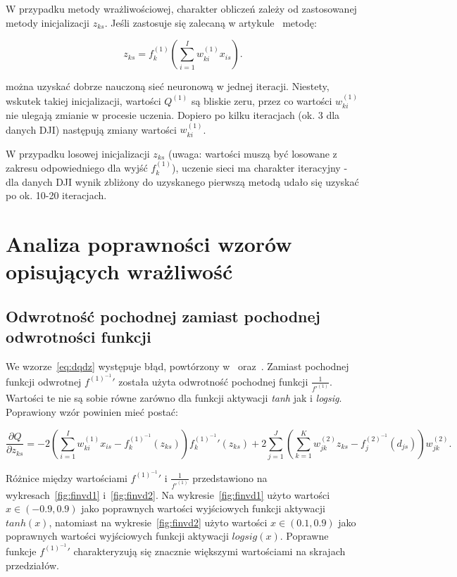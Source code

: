 \documentclass[11pt,a4paper]{article}
\begin{document}
W przypadku metody wrażliwościowej, charakter obliczeń zależy od zastosowanej metody inicjalizacji $z_{ks}$. Jeśli zastosuje się zalecaną w artykule~\cite{castillo2006very} metodę:

\begin{equation}
z_{ks} = f^{(1)}_{k} \left( \sum_{i=1}^{I} w^{(1)}_{ki} x_{is} \right).
\label{eq:zinit}
\end{equation}

\noindent można uzyskać dobrze nauczoną sieć neuronową w jednej iteracji. Niestety, wskutek takiej inicjalizacji, wartości $Q^{(1)}$ są bliskie zeru, przez co wartości $w_{ki}^{(1)}$ nie ulegają zmianie w procesie uczenia. Dopiero po kilku iteracjach (ok. 3 dla danych DJI) następują zmiany wartości $w_{ki}^{(1)}$.

W przypadku losowej inicjalizacji $z_{ks}$ (uwaga: wartości muszą być losowane z zakresu odpowiedniego dla wyjść $f_k^{(1)}$), uczenie sieci ma charakter iteracyjny - dla danych DJI wynik zbliżony do uzyskanego pierwszą metodą udało się uzyskać po ok. 10-20 iteracjach.

\section{Analiza poprawności wzorów opisujących wrażliwość}
\subsection{Odwrotność pochodnej zamiast pochodnej odwrotności funkcji\label{sec:dqdzcor}}
We wzorze~\ref{eq:dqdz} występuje błąd, powtórzony w~\cite{castillo2006very} oraz~\cite{guijarro2006new}. Zamiast pochodnej funkcji odwrotnej ${f^{(1)^{-1}}}'$ została użyta odwrotność pochodnej funkcji $\frac{1}{f'^{(1)}}$. Wartości te nie są sobie równe zarówno dla funkcji aktywacji \emph{tanh} jak i \emph{logsig}. Poprawiony wzór powinien mieć postać:

\begin{equation}
\frac{\partial Q}{\partial z_{ks}} = - 2 \left( \sum_{i=1}^{I} w^{(1)}_{ki} x_{is} - f^{(1)^{-1}}_k(z_{ks}) \right) {f^{(1)^{-1}}_k}'(z_{ks}) + 2 \sum_{j=1}^{J} \left( \sum_{k=1}^{K} w^{(2)}_{jk} z_{ks} - f^{(2)^{-1}}_j(d_{js}) \right) w^{(2)}_{jk}.
\label{eq:dqdzcor}
\end{equation}

Różnice między wartościami ${f^{(1)^{-1}}}'$ i $\frac{1}{f'^{(1)}}$ przedstawiono na wykresach~\ref{fig:finvd1} i~\ref{fig:finvd2}. Na wykresie~\ref{fig:finvd1} użyto wartości $x \in (-0.9, 0.9)$ jako poprawnych wartości wyjściowych funkcji aktywacji $tanh(x)$, natomiast na wykresie~\ref{fig:finvd2} użyto wartości $x \in (0.1, 0.9)$ jako poprawnych wartości wyjściowych funkcji aktywacji $logsig(x)$. Poprawne funkcje ${f^{(1)^{-1}}}'$ charakteryzują się znacznie większymi wartościami na skrajach przedziałów.
\end{document}
